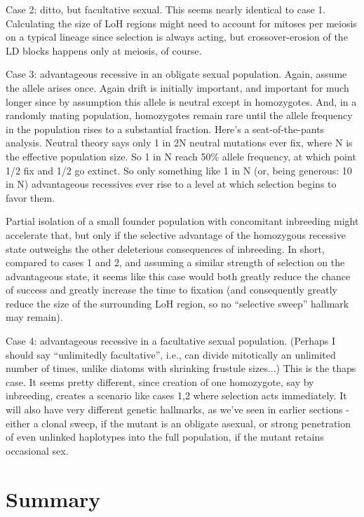 \documentclass{article}\usepackage[]{graphicx}\usepackage[]{color}
\begin{document}
Case 2: ditto, but facultative sexual. This seems nearly identical to case 1.  Calculating the size
of LoH regions might need to account for mitoses per meiosis on a typical lineage since selection is
always acting, but crossover-erosion of the LD blocks happens only at meiosis, of course.

Case 3: advantageous recessive in an obligate sexual population.  Again, assume the allele arises
once.  Again drift is initially important, and important for much longer since by assumption this
allele is neutral except in homozygotes.  And, in a randomly mating population, homozygotes remain
rare until the allele frequency in the population rises to a substantial fraction.  Here's a
seat-of-the-pants analysis.  Neutral theory says only 1 in 2N neutral mutations ever fix, where N is
the effective population size.  So 1 in N reach 50\% allele frequency, at which point 1/2 fix and
1/2 go extinct.  So only something like 1 in N (or, being generous: 10 in N) advantageous recessives
ever rise to a level at which selection begins to favor them.

Partial isolation of a small founder population with concomitant inbreeding might accelerate that,
but only if the selective advantage of the homozygous recessive state outweighs the other
deleterious consequences of inbreeding.  In short, compared to cases 1 and 2, and assuming a similar
strength of selection on the advantageous state, it seems like this case would both greatly reduce
the chance of success and greatly increase the time to fixation (and consequently greatly reduce the
size of the surrounding LoH region, so no ``selective sweep'' hallmark may remain).

Case 4: advantageous recessive in a facultative sexual population.  (Perhaps I should say
``unlimitedly facultative'', i.e., can divide mitotically an unlimited number of times, unlike
diatoms with shrinking frustule sizes...) This is the thaps case.  It seems pretty different, since
creation of one homozygote, say by inbreeding, creates a scenario like cases 1,2 where selection
acts immediately.  It will also have very different genetic hallmarks, as we've seen in earlier
sections - either a clonal sweep, if the mutant is an obligate asexual, or strong penetration of
even unlinked haplotypes into the full population, if the mutant retains occasional sex.

\section{Summary}
\label{sec:summary}
\end{document}
